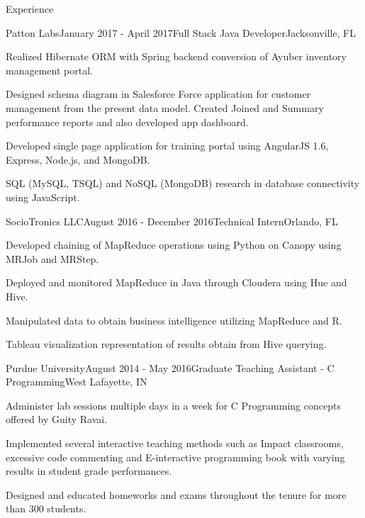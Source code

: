 \documentclass{resume} %
\begin{document}
\begin{rSection}{Experience}
\begin{rSubsection}{Patton Labs}{January 2017 - April 2017}{Full Stack Java Developer}{Jacksonville, FL}
\item Realized Hibernate ORM with Spring backend conversion of Ayuber inventory management portal.
\item Designed schema diagram in Salesforce Force application for customer management from the present data model. Created Joined and Summary performance reports and also developed app dashboard.
\item Developed single page application for training portal using AngularJS 1.6, Express, Node.js, and MongoDB.
\item SQL (MySQL, TSQL) and NoSQL (MongoDB) research in database connectivity using JavaScript.
\end{rSubsection}


\begin{rSubsection}{SocioTronics LLC}{August 2016 - December 2016}{Technical Intern}{Orlando, FL}
\item Developed chaining of MapReduce operations using Python on Canopy using MRJob and MRStep.
\item Deployed and monitored MapReduce in Java through Cloudera using Hue and Hive.
\item Manipulated data to obtain business intelligence utilizing MapReduce and R.
\item Tableau visualization representation of results obtain from Hive querying.
\end{rSubsection}


\begin{rSubsection}{Purdue University}{August 2014 - May 2016}{Graduate Teaching Assistant - C Programming}{West Lafayette, IN}
\item Administer lab sessions multiple days in a week for C Programming concepts offered by Guity Ravai.
\item Implemented several interactive teaching methods such as Impact classrooms, excessive code commenting and E-interactive programming book with varying results in student grade performances.
\item Designed and educated homeworks and exams throughout the tenure for more than 300 students.
\end{rSubsection}


\end{rSection}
\end{document}
